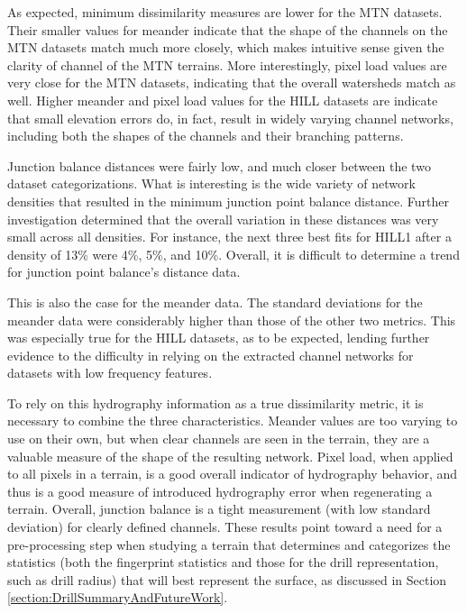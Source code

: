 As expected, minimum dissimilarity measures are lower for the MTN datasets. Their smaller values for meander indicate that the shape of the channels on the MTN datasets match much more closely, which makes intuitive sense given the clarity of channel of the MTN terrains. More interestingly, pixel load values are very close for the MTN datasets, indicating that the overall watersheds match as well. Higher meander and pixel load values for the HILL datasets are indicate that small elevation errors do, in fact, result in widely varying channel networks, including both the shapes of the channels and their branching patterns.

Junction balance distances were fairly low, and much closer between the two dataset categorizations. What is interesting is the wide variety of network densities that resulted in the minimum junction point balance distance. Further investigation determined that the overall variation in these distances was very small across all densities. For instance, the next three best fits for HILL1 after a density of 13\% were 4\%, 5\%, and 10\%. Overall, it is difficult to determine a trend for junction point balance's distance data.

This is also the case for the meander data. The standard deviations for the meander data were considerably higher than those of the other two metrics. This was especially true for the HILL datasets, as to be expected, lending further evidence to the difficulty in relying on the extracted channel networks for datasets with low frequency features. 

To rely on this hydrography information as a true dissimilarity metric, it is necessary to combine the three characteristics. Meander values are too varying to use on their own, but when clear channels are seen in the terrain, they are a valuable measure of the shape of the resulting network. Pixel load, when applied to all pixels in a terrain, is a good overall indicator of hydrography behavior, and thus is a good measure of introduced hydrography error when regenerating a terrain. Overall, junction balance is a tight measurement (with low standard deviation) for clearly defined channels. These results point toward a need for a pre-processing step when studying a terrain that determines and categorizes the statistics (both the fingerprint statistics and those for the drill representation, such as drill radius) that will best represent the surface, as discussed in Section \ref{section:DrillSummaryAndFutureWork}.


